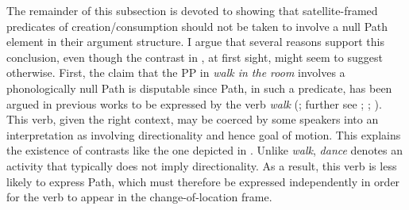 \documentclass[output=paper,colorlinks,citecolor=brown]{langscibook}
\begin{document}
The remainder of this subsection is devoted to showing that satellite-framed predicates of creation/consumption should not be taken to involve a null Path element in their argument structure. I argue that several reasons support this conclusion, even though the contrast in , at first sight, might seem to suggest otherwise. %
First, the claim that the PP in \textit{walk in the room} involves a phonologically null Path is disputable since Path, in such a predicate, has been argued in previous works to be expressed by the verb \textit{walk} (\citealt{Alexiadou2015}; further see \citealt[112, fn. 1]{big:Ramchand2008}; \citealt{Nikitina2008}; \citealt{BeaversLevinandTham2010}). This verb, given the right context, may be coerced by some speakers into an interpretation as involving directionality and hence goal of motion. %
This explains the existence of contrasts like the one depicted in . Unlike \textit{walk}, \textit{dance} denotes an activity that typically does not imply directionality. As a result, this verb is less likely to express Path, which must therefore be expressed independently in order for the verb to appear in the change-of-location frame. %
\end{document}
